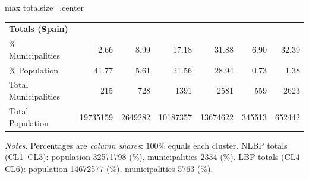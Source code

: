 \documentclass[a4paper,11pt,oneside]{article}
\begin{document}
\begin{table}
\begin{adjustbox}{max totalsize={\textwidth}{\textheight},center}
\begin{tabular}{llrrrrrr}
\multicolumn{8}{l}{\textbf{Totals (Spain)}} \\
\quad \% Municipalities & & \num{2.66} & \num{8.99} & \num{17.18} & \num{31.88} & \num{6.90} & \num{32.39} \\
\quad \% Population     & & \num{41.77} & \num{5.61} & \num{21.56} & \num{28.94} & \num{0.73} & \num{1.38} \\
\quad Total Municipalities & & \num{215} & \num{728} & \num{1391} & \num{2581} & \num{559} & \num{2623} \\
\quad Total Population  & & \num{19735159} & \num{2649282} & \num{10187357} & \num{13674622} & \num{345513} & \num{652442} \\
\bottomrule
\end{tabular}
\end{adjustbox}
\noindent\footnotesize\emph{Notes.} Percentages are \emph{column shares}: \(100\%\) equals each cluster.
NLBP totals (CL1--CL3): population \num{32571798} (\%), municipalities \num{2334} (\%).
LBP totals (CL4--CL6): population \num{14672577} (\%), municipalities \num{5763} (\%).
\end{table}


\clearpage
\pagebreak
\end{document}

